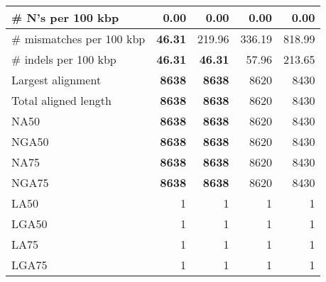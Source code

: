 \documentclass[12pt,a4paper]{article}
\begin{document}
\begin{table}[ht]
\begin{center}
\begin{tabular}{|l*{4}{|r}|}
\# N's per 100 kbp & 0.00 & 0.00 & 0.00 & 0.00 \\ \hline
\# mismatches per 100 kbp & {\bf 46.31} & 219.96 & 336.19 & 818.99 \\ \hline
\# indels per 100 kbp & {\bf 46.31} & {\bf 46.31} & 57.96 & 213.65 \\ \hline
Largest alignment & {\bf 8638} & {\bf 8638} & 8620 & 8430 \\ \hline
Total aligned length & {\bf 8638} & {\bf 8638} & 8620 & 8430 \\ \hline
NA50 & {\bf 8638} & {\bf 8638} & 8620 & 8430 \\ \hline
NGA50 & {\bf 8638} & {\bf 8638} & 8620 & 8430 \\ \hline
NA75 & {\bf 8638} & {\bf 8638} & 8620 & 8430 \\ \hline
NGA75 & {\bf 8638} & {\bf 8638} & 8620 & 8430 \\ \hline
LA50 & 1 & 1 & 1 & 1 \\ \hline
LGA50 & 1 & 1 & 1 & 1 \\ \hline
LA75 & 1 & 1 & 1 & 1 \\ \hline
LGA75 & 1 & 1 & 1 & 1 \\ \hline
\end{tabular}
\end{center}
\end{table}
\end{document}
